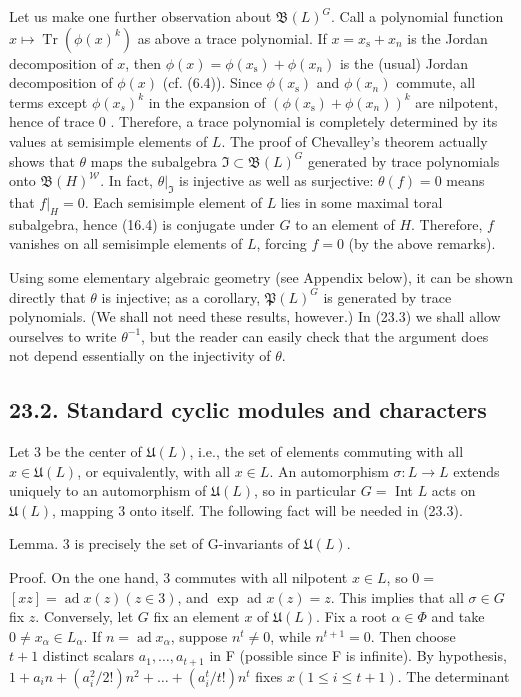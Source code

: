 \documentclass[10pt]{article}
\begin{document}
Let us make one further observation about $\mathfrak{B}(L)^{G}$. Call a polynomial function $x \mapsto \operatorname{Tr}\left(\phi(x)^{k}\right)$ as above a trace polynomial. If $x=x_{\mathrm{s}}+x_{n}$ is the Jordan decomposition of $x$, then $\phi(x)=\phi\left(x_{\mathrm{s}}\right)+\phi\left(x_{n}\right)$ is the (usual) Jordan decomposition of $\phi(x)$ (cf. (6.4)). Since $\phi\left(x_{\mathrm{s}}\right)$ and $\phi\left(x_{n}\right)$ commute, all terms except $\phi\left(x_{s}\right)^{k}$ in the expansion of $\left(\phi\left(x_{\mathrm{s}}\right)+\phi\left(x_{n}\right)\right)^{k}$ are nilpotent, hence of trace 0 . Therefore, a trace polynomial is completely determined by its values at semisimple elements of $L$. The proof of Chevalley's theorem actually shows that $\theta$ maps the subalgebra $\mathfrak{I} \subset \mathfrak{B}(L)^{G}$ generated by trace polynomials onto $\mathfrak{B}(H)^{\mathscr{W}}$. In fact, $\left.\theta\right|_{\mathfrak{I}}$ is injective as well as surjective: $\theta(f)=0$ means that $\left.f\right|_{H}=0$. Each semisimple element of $L$ lies in some maximal toral subalgebra, hence (16.4) is conjugate under $G$ to an element of $H$. Therefore, $f$ vanishes on all semisimple elements of $L$, forcing $f=0$ (by the above remarks).

Using some elementary algebraic geometry (see Appendix below), it can be shown directly that $\theta$ is injective; as a corollary, $\mathfrak{P}(L)^{G}$ is generated by trace polynomials. (We shall not need these results, however.) In (23.3) we shall allow ourselves to write $\theta^{-1}$, but the reader can easily check that the argument does not depend essentially on the injectivity of $\theta$.

\subsection*{23.2. Standard cyclic modules and characters}
Let 3 be the center of $\mathfrak{U}(L)$, i.e., the set of elements commuting with all $x \in \mathfrak{U}(L)$, or equivalently, with all $x \in L$. An automorphism $\sigma: L \rightarrow L$ extends uniquely to an automorphism of $\mathfrak{U}(L)$, so in particular $G=$ Int $L$ acts on $\mathfrak{U}(L)$, mapping 3 onto itself. The following fact will be needed in (23.3).

Lemma. 3 is precisely the set of G-invariants of $\mathfrak{U}(L)$.

Proof. On the one hand, 3 commutes with all nilpotent $x \in L$, so $0=$ $[x z]=\operatorname{ad} x(z)(z \in 3)$, and $\exp$ ad $x(z)=z$. This implies that all $\sigma \in G$ fix $z$. Conversely, let $G$ fix an element $x$ of $\mathfrak{U}(L)$. Fix a root $\alpha \in \Phi$ and take $0 \neq x_{\alpha} \in L_{\alpha}$. If $n=\operatorname{ad} x_{\alpha}$, suppose $n^{t} \neq 0$, while $n^{t+1}=0$. Then choose\\
$t+1$ distinct scalars $a_{1}, \ldots, a_{t+1}$ in F (possible since F is infinite). By hypothesis, $1+a_{i} n+\left(a_{i}^{2} / 2!\right) n^{2}+\ldots+\left(a_{i}^{t} / t!\right) n^{t}$ fixes $x(1 \leq i \leq t+1)$. The determinant
\end{document}
